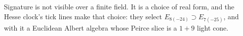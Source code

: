 \begin{keyidea}
Signature is not visible over a finite field. It is a choice of real form, and the Hesse
clock's tick lines make that choice: they select $E_{8(-24)}\supset E_{7(-25)}$, and with it
a Euclidean Albert algebra whose Peirce slice is a $1+9$ light cone.
\end{keyidea}
